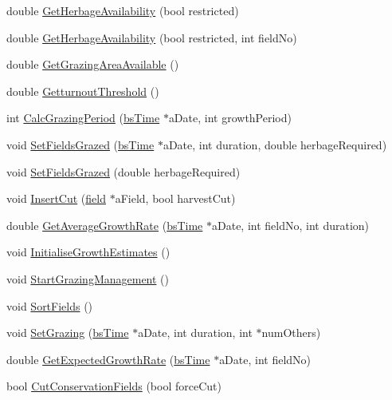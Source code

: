 \begin{DoxyCompactItemize}
\item 
double \hyperlink{classgrazing_manager_a9d3a5982adf0406463307e6b25a62f0c}{GetHerbageAvailability} (bool restricted)
\item 
double \hyperlink{classgrazing_manager_a4f0ad2c2781ed63cc717059d3780d548}{GetHerbageAvailability} (bool restricted, int fieldNo)
\item 
double \hyperlink{classgrazing_manager_a4523eb886c59064baeb1bf9d87ddbe50}{GetGrazingAreaAvailable} ()
\item 
double \hyperlink{classgrazing_manager_a9838ae6a2502cdcd82be4915c358f339}{GetturnoutThreshold} ()
\item 
int \hyperlink{classgrazing_manager_aaaedb1e74f765f6501d7bc7772ea8600}{CalcGrazingPeriod} (\hyperlink{classbs_time}{bsTime} $\ast$aDate, int growthPeriod)
\item 
void \hyperlink{classgrazing_manager_a602265e7f9501cf92722f06623365d89}{SetFieldsGrazed} (\hyperlink{classbs_time}{bsTime} $\ast$aDate, int duration, double herbageRequired)
\item 
void \hyperlink{classgrazing_manager_a27aa5c8d71dc9f1baca7d2209e63fe3b}{SetFieldsGrazed} (double herbageRequired)
\item 
void \hyperlink{classgrazing_manager_a6f01332621905d316bb39c5f51169dd9}{InsertCut} (\hyperlink{classfield}{field} $\ast$aField, bool harvestCut)
\item 
double \hyperlink{classgrazing_manager_a92d31c0f475ac2aaed6b01b1b72d5a57}{GetAverageGrowthRate} (\hyperlink{classbs_time}{bsTime} $\ast$aDate, int fieldNo, int duration)
\item 
void \hyperlink{classgrazing_manager_a65c9a2762d9760f899bba4cb65b1e024}{InitialiseGrowthEstimates} ()
\item 
void \hyperlink{classgrazing_manager_a52d950e97efbe047f9fec1493a0ce62e}{StartGrazingManagement} ()
\item 
void \hyperlink{classgrazing_manager_ab0930ab0af01943e76429ecdbb9d9dfd}{SortFields} ()
\item 
void \hyperlink{classgrazing_manager_af4d75fc52160ba2df1afa74db9727e5c}{SetGrazing} (\hyperlink{classbs_time}{bsTime} $\ast$aDate, int duration, int $\ast$numOthers)
\item 
double \hyperlink{classgrazing_manager_aa45455953b5da3c6c7898c9e99bb274b}{GetExpectedGrowthRate} (\hyperlink{classbs_time}{bsTime} $\ast$aDate, int fieldNo)
\item 
bool \hyperlink{classgrazing_manager_abc0c9f087272175f7d3f7f7d099c7fd8}{CutConservationFields} (bool forceCut)

\end{DoxyCompactItemize}
